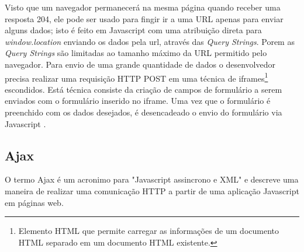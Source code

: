 Visto que um navegador permanecerá na mesma página quando receber uma resposta 204, ele pode ser usado para fingir ir a uma URL apenas para enviar alguns dados; isto é feito em Javascript com uma atribuição direta para \textit{window.location} enviando os dados pela url, através das \textit{Query Strings}. Porem as \textit{Query Strings} são limitadas ao tamanho máximo da URL permitido pelo navegador. Para envio de uma grande quantidade de dados o desenvolvedor precisa realizar uma requisição HTTP POST em uma técnica de iframes\footnote{Elemento HTML que permite carregar as informações de um documento HTML separado em um documento HTML existente.} escondidos. Está técnica consiste da criação de campos de formulário a serem enviados com o formulário inserido no iframe. Uma vez que o formulário é preenchido com os dados desejados, é desencadeado o envio do formulário via Javascript \cite{powell2008ajax}.


\subsection{Ajax}

O termo Ajax é um acronimo para "Javascript assincrono e XML" \cite{Garrett2005} e descreve uma maneira de realizar uma comunicação HTTP a partir de uma aplicação Javascript em páginas web.







